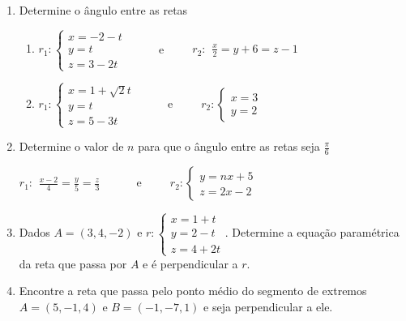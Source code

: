 \documentclass{article}
\begin{document}
\begin{enumerate}
\item Determine o \^angulo entre as retas

\begin{enumerate}
	\item
		$r_1:\left\{\begin{array}{l}
			x = -2 -t \\
			y = t \\
			z = 3 - 2t
		\end{array}\right.$
	\ \ \ \ \ e\ \ \ \ \ 
		$r_2:\begin{array}{l}
			\frac{x}{2} = y+6 = z-1
		\end{array}$
	\item
		$r_1:\left\{\begin{array}{l}
			x = 1 + \sqrt{2}t \\
			y = t \\
			z = 5 - 3t
		\end{array}\right.$
	\ \ \ \ \ e\ \ \ \ \ 
		$r_2:\left\{\begin{array}{l}
			x = 3 \\
			y = 2
		\end{array}\right.$
\end{enumerate}

\item Determine o valor de $n$ para que o \^angulo entre as retas seja $\frac{\pi}{6}$

$r_1:\begin{array}{l}
	\frac{x-2}{4} = \frac{y}{5} = \frac{z}{3}
\end{array}$
\ \ \ \ \ e\ \ \ \ \ 
$r_2:\left\{\begin{array}{l}
	y = nx + 5 \\
	z = 2x - 2
\end{array}\right.$

\item Dados $A = (3, 4, -2)$ e 
$r:\left\{\begin{array}{l}
	x = 1 + t \\
	y = 2 - t \\
	z = 4 + 2t
\end{array}\right.$. Determine a equa\c{c}\~ao param\'etrica da reta que passa por $A$ e \'e perpendicular a $r$.

\item Encontre a reta que passa pelo ponto m\'edio do segmento de extremos $A = (5, -1, 4)$ e $B = (-1, -7, 1)$ e seja perpendicular a ele.


\end{enumerate}
\end{document}
